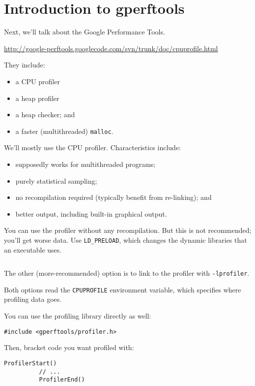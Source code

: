 




\section*{Introduction to gperftools}
Next, we'll talk about the Google Performance Tools. 
\begin{center}
\url{http://google-perftools.googlecode.com/svn/trunk/doc/cpuprofile.html}
\end{center}
They include:
      \begin{itemize}
        \item a CPU profiler
        \item a heap profiler
        \item a heap checker; and 
        \item a faster (multithreaded) {\tt malloc}.
      \end{itemize}

We'll mostly use the CPU profiler. Characteristics include:
      \begin{itemize}
        \item  supposedly works for
multithreaded programs;
        \item purely statistical sampling;
        \item no recompilation required (typically benefit from re-linking); and
        \item better output, including built-in graphical output.
      \end{itemize}

You can use the profiler without any recompilation. But this is not recommended;
you'll get worse data. Use {\tt LD\_PRELOAD}, which changes the dynamic libraries that
an executable uses.

  \begin{lstlisting}[basicstyle=\scriptsize]
  % LD_PRELOAD="/usr/lib/libprofiler.so" CPUPROFILE=test.prof ./test
  \end{lstlisting}

The other (more-recommended) option is to link to the profiler with {\tt -lprofiler}.

Both options read the {\tt CPUPROFILE} environment variable, which
specifies where profiling data goes.

You can use the profiling library directly as well:
\begin{lstlisting}[basicstyle=\scriptsize]
          #include <gperftools/profiler.h>
\end{lstlisting}
Then, bracket code you want profiled with:
\begin{lstlisting}[basicstyle=\scriptsize]
          ProfilerStart()
          // ...
          ProfilerEnd()
\end{lstlisting}
    
